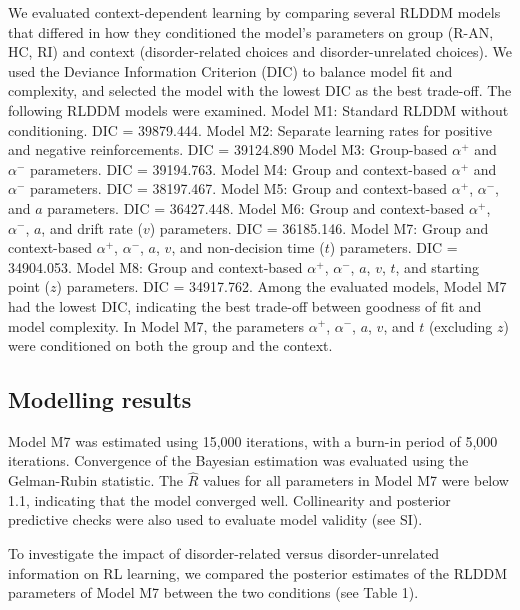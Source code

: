 \documentclass[
  man,floatsintext]{apa6}
\begin{document}
We evaluated context-dependent learning by comparing several RLDDM models that differed in how they conditioned the model's parameters on group (R-AN, HC, RI) and context (disorder-related choices and disorder-unrelated choices). We used the Deviance Information Criterion (DIC) to balance model fit and complexity, and selected the model with the lowest DIC as the best trade-off. The following RLDDM models were examined. Model M1: Standard RLDDM without conditioning. DIC = 39879.444. Model M2: Separate learning rates for positive and negative reinforcements. DIC = 39124.890 Model M3: Group-based \(\alpha^+\) and \(\alpha^-\) parameters. DIC = 39194.763. Model M4: Group and context-based \(\alpha^+\) and \(\alpha^-\) parameters. DIC = 38197.467. Model M5: Group and context-based \(\alpha^+\), \(\alpha^-\), and \(a\) parameters. DIC = 36427.448. Model M6: Group and context-based \(\alpha^+\), \(\alpha^-\), \(a\), and drift rate (\(v\)) parameters. DIC = 36185.146. Model M7: Group and context-based \(\alpha^+\), \(\alpha^-\), \(a\), \(v\), and non-decision time (\(t\)) parameters. DIC = 34904.053. Model M8: Group and context-based \(\alpha^+\), \(\alpha^-\), \(a\), \(v\), \(t\), and starting point (\(z\)) parameters. DIC = 34917.762. Among the evaluated models, Model M7 had the lowest DIC, indicating the best trade-off between goodness of fit and model complexity. In Model M7, the parameters \(\alpha^+\), \(\alpha^-\), \(a\), \(v\), and \(t\) (excluding \(z\)) were conditioned on both the group and the context.

\hypertarget{modelling-results}{%
\subsection{Modelling results}\label{modelling-results}}

Model M7 was estimated using 15,000 iterations, with a burn-in period of 5,000 iterations. Convergence of the Bayesian estimation was evaluated using the Gelman-Rubin statistic. The \(\hat{R}\) values for all parameters in Model M7 were below 1.1, indicating that the model converged well. Collinearity and posterior predictive checks were also used to evaluate model validity (see SI).

To investigate the impact of disorder-related versus disorder-unrelated information on RL learning, we compared the posterior estimates of the RLDDM parameters of Model M7 between the two conditions (see Table 1).
\end{document}
